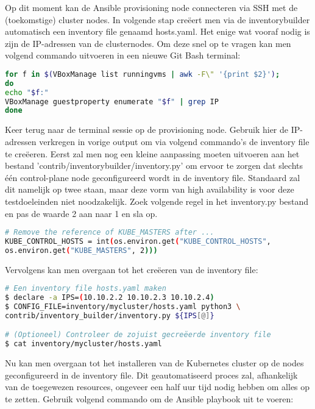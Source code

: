 Op dit moment kan de Ansible provisioning node connecteren via SSH met de (toekomstige) cluster nodes. In volgende stap creëert men via de inventory\textunderscore builder automatisch een inventory file genaamd hosts.yaml. Het enige wat vooraf nodig is zijn de IP-adressen van de clusternodes. Om deze snel op te vragen kan men volgend commando uitvoeren in een nieuwe Git Bash terminal:

\begin{lstlisting}[language=bash] 
for f in $(VBoxManage list runningvms | awk -F\" '{print $2}'); 
do
echo "$f:"
VBoxManage guestproperty enumerate "$f" | grep IP
done
\end{lstlisting}  

Keer terug naar de terminal sessie op de provisioning node. Gebruik hier de IP-adressen verkregen in vorige output om via volgend commando's de inventory file te creëeren. 
Eerst zal men nog een kleine aanpassing moeten uitvoeren aan het bestand 'contrib/inventory\textunderscore builder/inventory.py' om ervoor te zorgen dat slechts één control-plane node geconfigureerd wordt in de inventory file. Standaard zal dit namelijk op twee staan, maar deze vorm van high availability is voor deze testdoeleinden niet noodzakelijk. 
Zoek volgende regel in het inventory.py bestand en pas de waarde 2 aan naar 1 en sla op.

\begin{lstlisting}[language=bash]
# Remove the reference of KUBE_MASTERS after ...
KUBE_CONTROL_HOSTS = int(os.environ.get("KUBE_CONTROL_HOSTS",
os.environ.get("KUBE_MASTERS", 2)))

\end{lstlisting}  

Vervolgens kan men overgaan tot het creëeren van de inventory file: 

\begin{lstlisting}[language=bash]
# Een inventory file hosts.yaml maken
$ declare -a IPS=(10.10.2.2 10.10.2.3 10.10.2.4)
$ CONFIG_FILE=inventory/mycluster/hosts.yaml python3 \
contrib/inventory_builder/inventory.py ${IPS[@]}    

# (Optioneel) Controleer de zojuist gecreëerde inventory file
$ cat inventory/mycluster/hosts.yaml

\end{lstlisting}

Nu kan men overgaan tot het installeren van de Kubernetes cluster op de nodes geconfigureerd in de inventory file. Dit geautomatiseerd proces zal, afhankelijk van de toegewezen resources, ongeveer een half uur tijd nodig hebben om alles op te zetten. Gebruik volgend commando om de Ansible playbook uit te voeren: 

